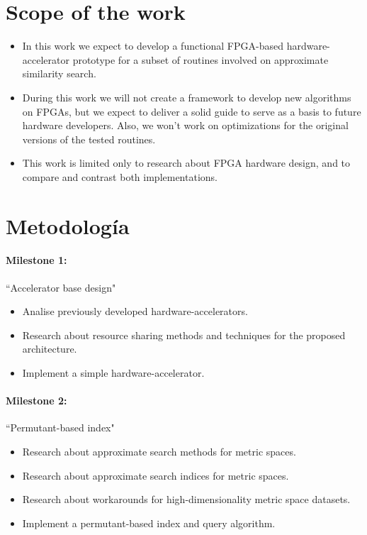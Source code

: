 \documentclass[11pt,letterpaper]{article}
\begin{document}
\section{Scope of the work}
\begin{itemize}
\item In this work we expect to develop a functional FPGA-based hardware-accelerator prototype for a subset of routines involved on approximate similarity search.
\item During this work we will not create a framework to develop new algorithms on FPGAs, but we expect to deliver a solid guide to serve as a basis to future hardware developers. Also, we won't work on optimizations for the original versions of the tested routines.
\item This work is limited only to research about FPGA hardware design, and to compare and contrast both implementations.
\end{itemize}



\section{Metodología}

\paragraph{Milestone 1:} ``Accelerator base design"
\begin{itemize}
\item Analise previously developed hardware-accelerators.
\item Research about resource sharing methods and techniques for the proposed architecture.
\item Implement a simple hardware-accelerator.
\end{itemize}

\paragraph{Milestone 2:} ``Permutant-based index"
\begin{itemize}
\item Research about approximate search methods for metric spaces.
\item Research about approximate search indices for metric spaces.
\item Research about workarounds for high-dimensionality metric space datasets.
\item Implement a permutant-based index and query algorithm.
\end{itemize}
\end{document}
